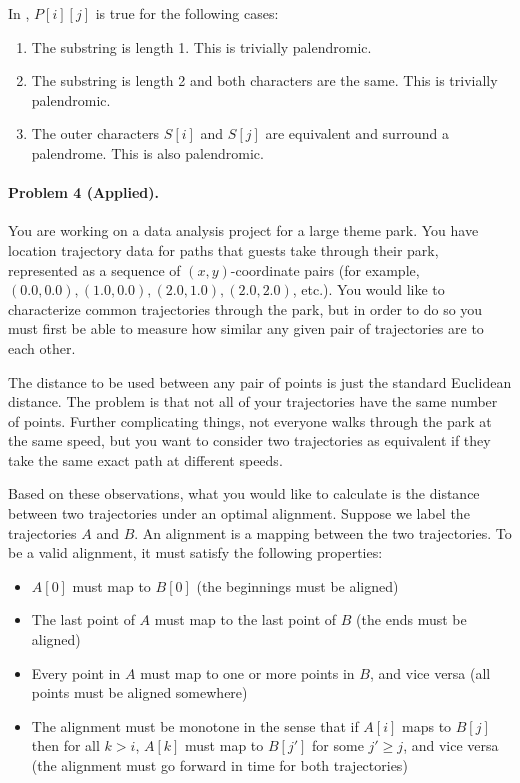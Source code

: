 \documentclass[11pt]{article}
\begin{document}
In , $P[i][j]$ is true for the following cases:
\begin{enumerate}
    \item The substring is length 1. This is trivially palendromic.
    \item The substring is length 2 and both characters are the same. This is
        trivially palendromic.
    \item The outer characters $S[i]$ and $S[j]$ are equivalent and surround a
        palendrome. This is also palendromic.
\end{enumerate}



\newpage
\paragraph{Problem 4 (Applied).} You are working on a data analysis project for a large theme park. You have location trajectory data for paths that guests take through their park, represented as a sequence of $(x, y)$-coordinate pairs (for example, $(0.0, 0.0), (1.0, 0.0), (2.0, 1.0), (2.0, 2.0)$, etc.). You would like to characterize common trajectories through the park, but in order to do so you must first be able to measure how similar any given pair of trajectories are to each other.

The distance to be used between any pair of points is just the standard Euclidean distance. The problem is that not all of your trajectories have the same number of points. Further complicating things, not everyone walks through the park at the same speed, but you want to consider two trajectories as equivalent if they take the same exact path at different speeds.

Based on these observations, what you would like to calculate is the distance between two trajectories under an optimal alignment. Suppose we label the trajectories $A$ and $B$. An alignment is a mapping between the two trajectories. To be a valid alignment, it must satisfy the following properties:
\begin{itemize}
    \item $A[0]$ must map to $B[0]$ (the beginnings must be aligned)
    \item The last point of $A$ must map to the last point of $B$ (the ends must be aligned)
    \item Every point in $A$ must map to one or more points in $B$, and vice versa (all points must be aligned somewhere)
    \item The alignment must be monotone in the sense that if $A[i]$ maps to $B[j]$ then for all $k > i$, $A[k]$ must map to $B[j']$ for some $j' \geq j$, and vice versa (the alignment must go forward in time for both trajectories)
\end{itemize}
\end{document}
